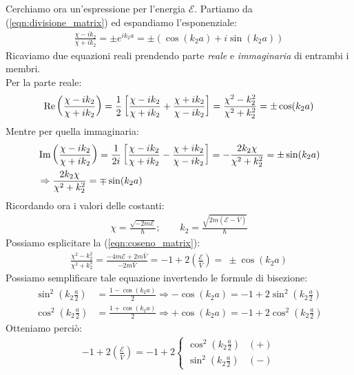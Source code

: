 \documentclass[../../FisicaTeorica.tex]{subfiles}
\begin{document}
Cerchiamo ora un'espressione per l'energia $\mathcal{E}$. Partiamo da (\ref{eqn:divisione_matrix}) ed espandiamo l'esponenziale:
\begin{align*}
\frac{\chi-ik_2}{\chi + ik_2} = \pm e^{ik_2 a} = \pm(\cos(k_2 a) + i\sin(k_2 a))
\end{align*}
Ricaviamo due equazioni reali prendendo parte \textit{reale} e \textit{immaginaria} di entrambi i membri.\\
Per la parte reale:
\begin{align}
\operatorname{Re}\left( \frac{\chi-ik_2}{\chi + ik_2}\right) = \frac{1}{2}\left[\frac{\chi-ik_2}{\chi + ik_2} + \frac{\chi+ik_2}{\chi-ik_2}\right] = \frac{\chi^2-k_2^2}{\chi^2+k_2^2} = \pm\cos(k_2a)\label{eqn:coseno_matrix}
\end{align}
Mentre per quella immaginaria:
\begin{align}\nonumber
&\operatorname{Im}\left(\frac{\chi-ik_2}{\chi+ik_2}\right)=\frac{1}{2i}\left[\frac{\chi-ik_2}{\chi+ik_2}-\frac{\chi+ik_2}{\chi-ik_2}\right]=-\frac{2k_2\chi}{\chi^2 + k_2^2}=\pm \sin(k_2a)\\
&\Rightarrow \frac{2k_2 \chi}{\chi^2 + k_2^2} = \mp \sin(k_2a)
\label{eqn:equazione_seno}
\end{align}
Ricordando ora i valori delle costanti:
\begin{align*}
\chi = \frac{\sqrt{-2m\mathcal{E}}}{\hbar}; \qquad k_2 = \frac{\sqrt{2m(\mathcal{E}-\bar{V})}}{\hbar}
\end{align*}
Possiamo esplicitare la (\ref{eqn:coseno_matrix}):
\begin{align*}
\frac{\chi^2 -k_2^2}{\chi^2 + k_2^2} =\frac{-4m\mathcal{E} +2m\bar{V}}{-2m\bar{V}} =-1 + 2\left(\frac{\mathcal{E}}{\bar{V}}\right) =\ \pm \cos(k_2a)
\end{align*}
Possiamo semplificare tale equazione invertendo le formule di bisezione:
\begin{align*}
\sin^2\left(k_2 \frac{a}{2}\right) &= \frac{1-\cos(k_2a)}{2}\Rightarrow -\cos(k_2 a)=-1+2\sin^2\left(k_2 \frac{a}{2}\right)\\
\cos^2\left(k_2 \frac{a}{2}\right) &= \frac{1+\cos(k_2a)}{2}\Rightarrow +\cos(k_2a) = -1+2\cos^2\left(k_2\frac{a}{2}\right)
\end{align*}
Otteniamo perciò:
\begin{align}
-1 + 2\left(\frac{\mathcal{E}}{\bar{V}}\right) = -1 + 2\begin{cases}
\cos^2 \left(k_2 \frac{a}{2}\right) & (+)\\
\sin^2 \left(k_2 \frac{a}{2}\right) & (-)
\end{cases}
\label{eqn:equazione_coseno}
\end{align}
\end{document}
